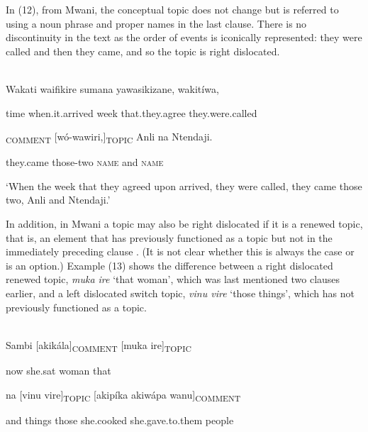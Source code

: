 \documentclass[output=paper]{langsci/langscibook}
\begin{document}
\begin{styleLangSciTranslation}
In (12), from Mwani, the conceptual topic does not change but is referred to using a noun phrase and proper names in the last clause. There is no discontinuity in the text as the order of events is iconically represented: they were called and then they came, and so the topic is right dislocated.

\ea\label{ex:}
\\
\gll Wakati waifikire sumana yawasikizane, wakitíwa,\\
\begin{styleUntitledi}
time when.it.arrived week that.they.agree they.were.called
\end{styleUntitledi}

\gll [wakíja]\textsubscript{COMMENT} [wó-wawiri,]\textsubscript{TOPIC} Anli na Ntendaji.\\
\begin{styleUntitledi}
they.came those-two \textsc{name }and \textsc{name}
\end{styleUntitledi}

\glt \textup{‘}\textup{When the week that they agreed upon arrived, they were called, they came those two, Anli and Ntendaji.’}
\z

In addition, in Mwani a topic may also be right dislocated if it is a renewed topic, that is, an element that has previously functioned as a topic but not in the immediately preceding clause \citep[10-11]{Floor2005}. (It is not clear whether this is always the case or is an option.) Example (13) shows the difference between a right dislocated renewed topic, \textit{muk}\textit{a ire} ‘that woman’, which was last mentioned two clauses earlier, and a left dislocated switch topic, \textit{vinu vire} ‘those things’, which has not previously functioned as a topic.

\ea\label{ex:}
\\
\gll Sambi [akikála]\textsubscript{COMMENT} [muka ire]\textsubscript{TOPIC}\\
\begin{styleUntitledi}
now she.sat woman that
\end{styleUntitledi}

\gll na [vinu vire]\textsubscript{TOPIC} [akipíka akiwápa wanu]\textsubscript{COMMENT}\\
\begin{styleUntitledi}
and things those she.cooked she.gave.to.them people
\end{styleUntitledi}


\end{styleLangSciTranslation}
\end{document}
